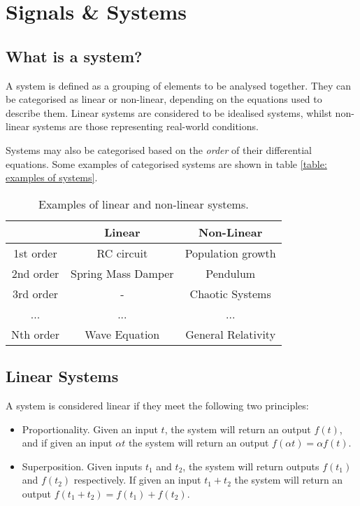 \chapter{Signals \& Systems}

\section{What is a system?}

A system is defined as a grouping of elements to be 
analysed together. They can be categorised as linear or 
non-linear, depending on the equations used to 
describe them.
Linear systems are considered to be idealised systems, 
whilst non-linear systems are those representing real-world 
conditions.

Systems may also be categorised based on the
\emph{order} of their differential equations. Some examples 
of categorised systems are shown in table \ref{table: 
examples of systems}.


\begin{table}[h!]
\centering
\begin{tabular}{c|cc}
 & Linear & Non-Linear\\
 \hline
1st order & RC circuit & Population growth\\
2nd order & Spring Mass Damper & Pendulum\\
3rd order & - & Chaotic Systems\\
... & ...  & ... \\
Nth order & Wave Equation & General Relativity\\
\hline
\end{tabular}
\label{table: examples of systems}
\caption{Examples of linear and non-linear systems.}
\end{table}

\section{Linear Systems}
A system is considered linear if they meet the following 
two principles: 

\begin{itemize}
 \item Proportionality. Given an input $t$, the system will 
return an output $f(t)$, and if given an input $\alpha t$ 
the system will return an output $f(\alpha t) = \alpha 
f(t)$.
 \item Superposition. Given inputs $t_1$ and $t_2$, the 
system will return outputs $f(t_1)$ and $f(t_2)$ 
respectively. If given an input $t_1 + t_2$ the system will 
return an output $f(t_1 + t_2) = f(t_1) + f(t_2)$.
\end{itemize}

